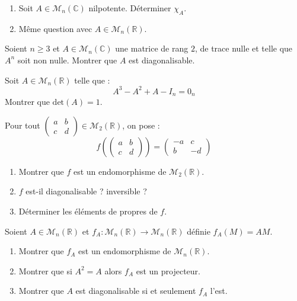 \documentclass[a4paper,10pt]{report}
\begin{document}
\begin{Exercice}{}
  \begin{enumerate}
  \item  Soit $A \in \mathcal{M}_{n}(\mathbb{C})$ nilpotente. Déterminer $\chi_{A}$.
  \item Même question avec $A \in \mathcal{M}_{n}(\mathbb{R})$.
  \end{enumerate}
\end{Exercice} 


\begin{Exercice}{} Soient $n \geq 3$ et $A \in \mathcal{M}_{n}(\mathbb{C})$ une matrice de rang $2$, de trace nulle et telle que $A^n$ soit non nulle. Montrer que $A$ est diagonalisable.
\end{Exercice}


\begin{Exercice}{} Soit $A \in \mathcal{M}_{n}(\mathbb{R})$ telle que :
  \[
  A^{3} - A^{2} + A - I_n = 0_n
  \]
Montrer que $\textrm{det}(A) = 1$.
\end{Exercice}


\begin{Exercice}{} Pour tout $\begin{pmatrix}
a & b \\
c & d 
\end{pmatrix} \in \mathcal{M}_2(\mathbb{R})$, on pose :
$$ f \left( \begin{pmatrix}
a & b \\
c & d 
\end{pmatrix} \right) = \begin{pmatrix}
-a & c \\
b & -d 
\end{pmatrix}$$

\begin{enumerate}
\item Montrer que $f$ est un endomorphisme de $\mathcal{M}_2(\mathbb{R})$.
\item $f$ est-il diagonalisable ? inversible ?
\item Déterminer les éléments de propres de $f$.
\end{enumerate}
\end{Exercice}



\begin{Exercice}{} Soient $A \in \mathcal{M}_n(\mathbb{R})$ et $f_A : \mathcal{M}_n(\mathbb{R}) \rightarrow \mathcal{M}_n(\mathbb{R})$ définie $f_A(M)=AM$.

\begin{enumerate}
\item Montrer que $f_A$ est un endomorphisme de $\mathcal{M}_n(\mathbb{R})$.
\item Montrer que si $A^2=A$ alors $f_A$ est un projecteur.
\item Montrer que $A$ est diagonalisable si et seulement $f_A$ l'est.
\end{enumerate}
\end{Exercice}
\end{document}
